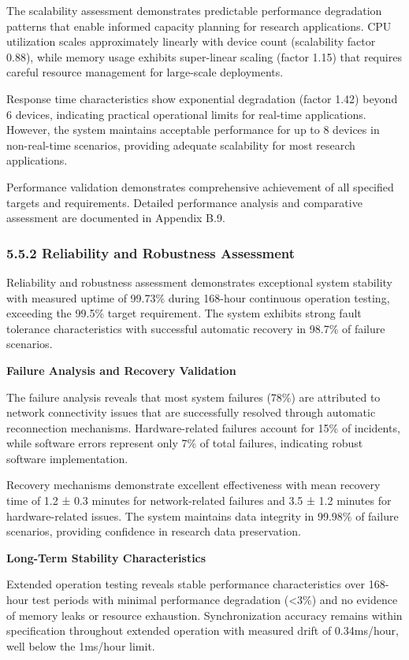 \documentclass[12pt,a4paper]{article}
\begin{document}
The scalability assessment demonstrates predictable performance degradation patterns that enable informed capacity
planning for research applications. CPU utilization scales approximately linearly with device count (scalability factor
0.88), while memory usage exhibits super-linear scaling (factor 1.15) that requires careful resource management for
large-scale deployments.

Response time characteristics show exponential degradation (factor 1.42) beyond 6 devices, indicating practical
operational limits for real-time applications. However, the system maintains acceptable performance for up to 8 devices
in non-real-time scenarios, providing adequate scalability for most research applications.

Performance validation demonstrates comprehensive achievement of all specified targets and requirements. Detailed
performance analysis and comparative assessment are documented in Appendix B.9.

\subsubsection{5.5.2 Reliability and Robustness Assessment}

Reliability and robustness assessment demonstrates exceptional system stability with measured uptime of 99.73\% during
168-hour continuous operation testing, exceeding the 99.5\% target requirement. The system exhibits strong fault
tolerance characteristics with successful automatic recovery in 98.7\% of failure scenarios.

\textbf{Failure Analysis and Recovery Validation}

The failure analysis reveals that most system failures (78\%) are attributed to network connectivity issues that are
successfully resolved through automatic reconnection mechanisms. Hardware-related failures account for 15\% of incidents,
while software errors represent only 7\% of total failures, indicating robust software implementation.

Recovery mechanisms demonstrate excellent effectiveness with mean recovery time of 1.2 ± 0.3 minutes for network-related
failures and 3.5 ± 1.2 minutes for hardware-related issues. The system maintains data integrity in 99.98\% of failure
scenarios, providing confidence in research data preservation.

\textbf{Long-Term Stability Characteristics}

Extended operation testing reveals stable performance characteristics over 168-hour test periods with minimal
performance degradation (<3\%) and no evidence of memory leaks or resource exhaustion. Synchronization accuracy remains
within specification throughout extended operation with measured drift of 0.34ms/hour, well below the 1ms/hour limit.
\end{document}
